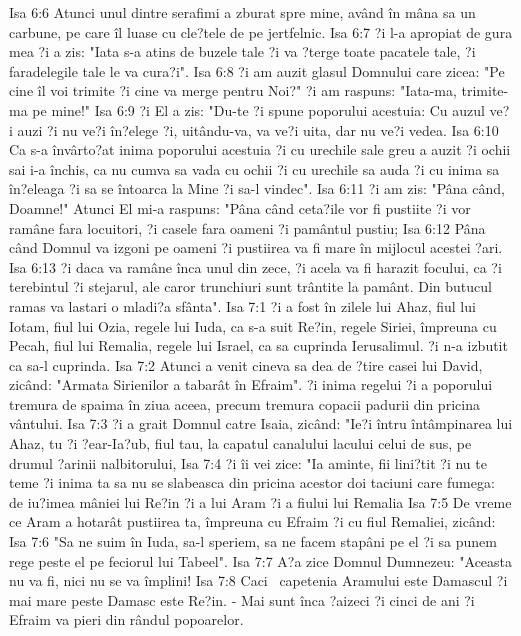 Isa 6:6  Atunci unul dintre serafimi a zburat spre mine, având în mâna sa un carbune, pe care îl luase cu cle?tele de pe jertfelnic.
Isa 6:7  ?i l-a apropiat de gura mea ?i a zis: "Iata s-a atins de buzele tale ?i va ?terge toate pacatele tale, ?i faradelegile tale le va cura?i".
Isa 6:8  ?i am auzit glasul Domnului care zicea: "Pe cine îl voi trimite ?i cine va merge pentru Noi?" ?i am raspuns: "Iata-ma, trimite-ma pe mine!"
Isa 6:9  ?i El a zis: "Du-te ?i spune poporului acestuia: Cu auzul ve?i auzi ?i nu ve?i în?elege ?i, uitându-va, va ve?i uita, dar nu ve?i vedea.
Isa 6:10  Ca s-a învârto?at inima poporului acestuia ?i cu urechile sale greu a auzit ?i ochii sai i-a închis, ca nu cumva sa vada cu ochii ?i cu urechile sa auda ?i cu inima sa în?eleaga ?i sa se întoarca la Mine ?i sa-l vindec".
Isa 6:11  ?i am zis: "Pâna când, Doamne!" Atunci El mi-a raspuns: "Pâna când ceta?ile vor fi pustiite ?i vor ramâne fara locuitori, ?i casele fara oameni ?i pamântul pustiu;
Isa 6:12  Pâna când Domnul va izgoni pe oameni ?i pustiirea va fi mare în mijlocul acestei ?ari.
Isa 6:13  ?i daca va ramâne înca unul din zece, ?i acela va fi harazit focului, ca ?i terebintul ?i stejarul, ale caror trunchiuri sunt trântite la pamânt. Din butucul ramas va lastari o mladi?a sfânta".
Isa 7:1  ?i a fost în zilele lui Ahaz, fiul lui Iotam, fiul lui Ozia, regele lui Iuda, ca s-a suit Re?in, regele Siriei, împreuna cu Pecah, fiul lui Remalia, regele lui Israel, ca sa cuprinda Ierusalimul. ?i n-a izbutit ca sa-l cuprinda.
Isa 7:2  Atunci a venit cineva sa dea de ?tire casei lui David, zicând: "Armata Sirienilor a tabarât în Efraim". ?i inima regelui ?i a poporului tremura de spaima în ziua aceea, precum tremura copacii padurii din pricina vântului.
Isa 7:3  ?i a grait Domnul catre Isaia, zicând: "Ie?i întru întâmpinarea lui Ahaz, tu ?i ?ear-Ia?ub, fiul tau, la capatul canalului lacului celui de sus, pe drumul ?arinii nalbitorului,
Isa 7:4  ?i îi vei zice: "Ia aminte, fii lini?tit ?i nu te teme ?i inima ta sa nu se slabeasca din pricina acestor doi taciuni care fumega: de iu?imea mâniei lui Re?in ?i a lui Aram ?i a fiului lui Remalia
Isa 7:5  De vreme ce Aram a hotarât pustiirea ta, împreuna cu Efraim ?i cu fiul Remaliei, zicând:
Isa 7:6  "Sa ne suim în Iuda, sa-l speriem, sa ne facem stapâni pe el ?i sa punem rege peste el pe feciorul lui Tabeel".
Isa 7:7  A?a zice Domnul Dumnezeu: "Aceasta nu va fi, nici nu se va împlini!
Isa 7:8  Caci  capetenia Aramului este Damascul ?i mai mare peste Damasc este Re?in. - Mai sunt înca ?aizeci ?i cinci de ani ?i Efraim va pieri din rândul popoarelor.
